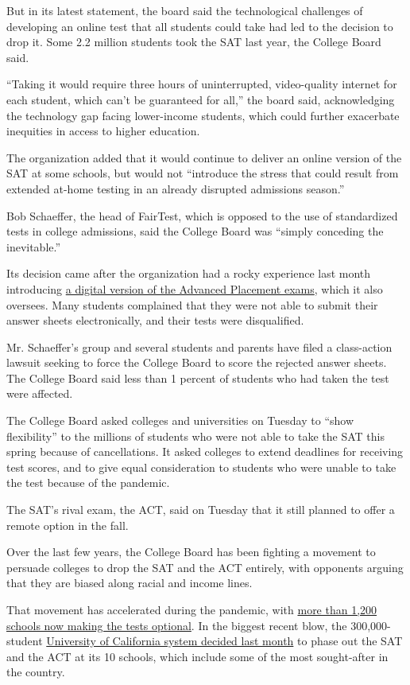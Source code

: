 But in its latest statement, the board said the technological challenges
of developing an online test that all students could take had led to the
decision to drop it. Some 2.2 million students took the SAT last year,
the College Board said.

``Taking it would require three hours of uninterrupted, video-quality
internet for each student, which can't be guaranteed for all,'' the
board said, acknowledging the technology gap facing lower-income
students, which could further exacerbate inequities in access to higher
education.

The organization added that it would continue to deliver an online
version of the SAT at some schools, but would not ``introduce the stress
that could result from extended at-home testing in an already disrupted
admissions season.''

Bob Schaeffer, the head of FairTest, which is opposed to the use of
standardized tests in college admissions, said the College Board was
``simply conceding the inevitable.''

Its decision came after the organization had a rocky experience last
month introducing
\href{https://www.nytimes.com/2020/05/16/us/AP-exams-test-glitch-virus.html}{a
digital version of the Advanced Placement exams}, which it also
oversees. Many students complained that they were not able to submit
their answer sheets electronically, and their tests were disqualified.

Mr. Schaeffer's group and several students and parents have filed a
class-action lawsuit seeking to force the College Board to score the
rejected answer sheets. The College Board said less than 1 percent of
students who had taken the test were affected.

The College Board asked colleges and universities on Tuesday to ``show
flexibility'' to the millions of students who were not able to take the
SAT this spring because of cancellations. It asked colleges to extend
deadlines for receiving test scores, and to give equal consideration to
students who were unable to take the test because of the pandemic.

The SAT's rival exam, the ACT, said on Tuesday that it still planned to
offer a remote option in the fall.

Over the last few years, the College Board has been fighting a movement
to persuade colleges to drop the SAT and the ACT entirely, with
opponents arguing that they are biased along racial and income lines.

That movement has accelerated during the pandemic, with
\href{https://www.nytimes.com/article/sat-act-test-optional-colleges-coronavirus.html}{more
than 1,200 schools now making the tests optional}. In the biggest recent
blow, the 300,000-student
\href{https://www.nytimes.com/2020/05/21/us/university-california-sat-act.html}{University
of California system decided last month} to phase out the SAT and the
ACT at its 10 schools, which include some of the most sought-after in
the country.

